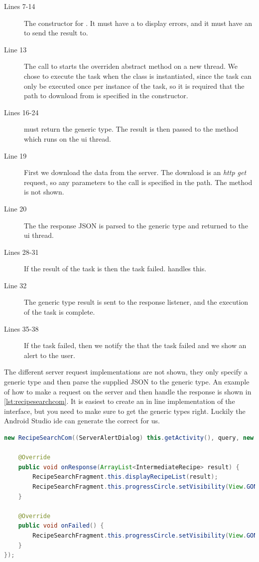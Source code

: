 \begin{description}
\item[Lines 7-14] The constructor for . It must have a  to display errors, and it must have an  to send the result to.
\item[Line 13] The call to  starts the overriden abstract method  on a new thread. We chose to execute the task when the class is instantiated, since the task can only be executed once per instance of the task, so it is required that the path to download from is specified in the constructor.
\item[Lines 16-24]  must return the generic type. The result is then passed to the method  which runs on the \ac{ui} thread.
\item[Line 19] First we download the data from the server. The download is an \textit{http get} request, so any parameters to the call is specified in the path. The  method is not shown.
\item[Line 20] The the response JSON is parsed to the generic type and returned to the \ac{ui} thread.
\item[Lines 28-31] If the result of the task is  then the task failed.  handles this.
\item[Line 32] The generic type result is sent to the response listener, and the execution of the task is complete.
\item[Lines 35-38] If the task failed, then we notify the  that the task failed and we show an alert to the user.
\end{description}
The different server request implementations are not shown, they only specify a generic type and then parse the supplied JSON to the generic type. An example of how to make a request on the server and then handle the response is shown in \autoref{lst:recipesearchcom}. It is easiest to create an in line implementation of the  interface, but you need to make sure to get the generic types right. Luckily the Android Studio \ac{ide}  can generate the correct  for us.

\begin{lstlisting}[language=java, label=lst:recipesearchcom, caption={Search for recipes by text}]
new RecipeSearchCom((ServerAlertDialog) this.getActivity(), query, new OnResponseListener<ArrayList<IntermediateRecipe>>() {
    
    @Override
    public void onResponse(ArrayList<IntermediateRecipe> result) {
        RecipeSearchFragment.this.displayRecipeList(result);
        RecipeSearchFragment.this.progressCircle.setVisibility(View.GONE);
    }

    @Override
    public void onFailed() {
        RecipeSearchFragment.this.progressCircle.setVisibility(View.GONE);
    }
});
\end{lstlisting}

